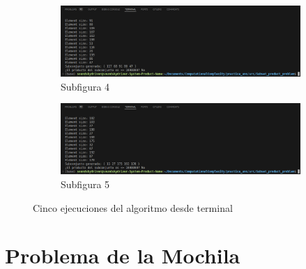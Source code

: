 \documentclass{article}
\begin{document}
\begin{figure}[H]
    \begin{subfigure}{0.7\textwidth}
        \centering
        \includegraphics[width=\textwidth]{../images/Screenshot from 2024-09-19 23-21-22.png}
        \caption{Subfigura 4}
        \label{fig:subfig4}
    \end{subfigure}
    \hfill
    \begin{subfigure}{0.7\textwidth}
        \centering
        \includegraphics[width=\textwidth]{../images/Screenshot from 2024-09-19 23-21-26.png}
        \caption{Subfigura 5}
        \label{fig:subfig5}
    \end{subfigure}

    \caption{Cinco ejecuciones del algoritmo desde terminal}
    \label{fig:all_subfigures}
\end{figure}


\section{Problema de la Mochila}
\end{document}

